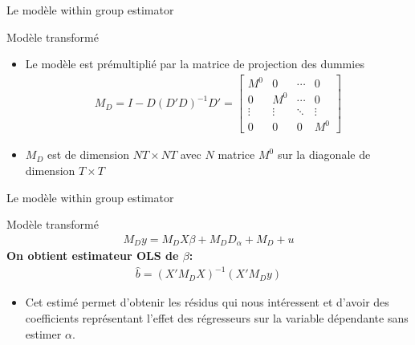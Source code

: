 \documentclass{beamer}
\begin{document}
\begin{frame}{Le modèle within group estimator}
\begin{block}{Modèle transformé}
\begin{itemize}
\item Le modèle est prémultiplié par la matrice de projection des dummies
\begin{align*}
M_D=I-D(D'D)^{-1}D'=\begin{bmatrix} 
M^{0} & 0 & \cdots & 0 \\
0 & M^0 & \cdots & 0 \\
\vdots & \vdots & \ddots & \vdots \\
0 & 0 & 0 & M^0
\end{bmatrix} 
\end{align*}
\item $M_D$ est de dimension $NT \times NT$ avec $N$ matrice $M^0$ sur la diagonale de dimension $T \times T$
\end{itemize}
\end{block}
\end{frame}

\begin{frame}{Le modèle within group estimator}
\begin{block}{Modèle transformé}
\begin{align*}
M_D y = M_D X\beta + M_D D_{\alpha}+M_D+u
\end{align*}
\textbf{On obtient estimateur OLS de $\beta$:}
\begin{align*}
\hat{b}= (X'M_DX)^{-1}(X'M_Dy)
\end{align*}
\begin{itemize}
\item Cet estimé permet d’obtenir les résidus qui nous intéressent et d’avoir des coefficients représentant l’effet des régresseurs sur la variable dépendante sans estimer $\alpha$.
\end{itemize}
\end{block}
\end{frame}
\end{document}
